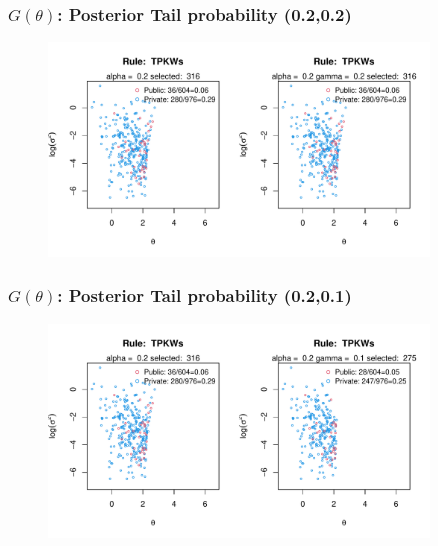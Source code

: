 \documentclass[10pt,mathserif,aspectratio=169]{beamer}
\begin{document}
\begin{frame}
  \frametitle{$G(\theta)$: Posterior Tail probability (0.2,0.2)}
  \begin{figure}
    \centering
    \includegraphics[width=0.9\textwidth]{../../Figures/2013-2022/GMM_fd/GLmix/Left_0.2_0.2_TPKWs.pdf}
  \end{figure}
\end{frame}

\begin{frame}[label=tpselect]
  \frametitle{$G(\theta)$: Posterior Tail probability (0.2,0.1)}
  \begin{figure}
    \centering
    \includegraphics[width=0.9\textwidth]{../../Figures/2013-2022/GMM_fd/GLmix/Left_0.2_0.1_TPKWs.pdf}
  \end{figure}
  \hyperlink{tpcontour}{}
\end{frame}

\end{document}
